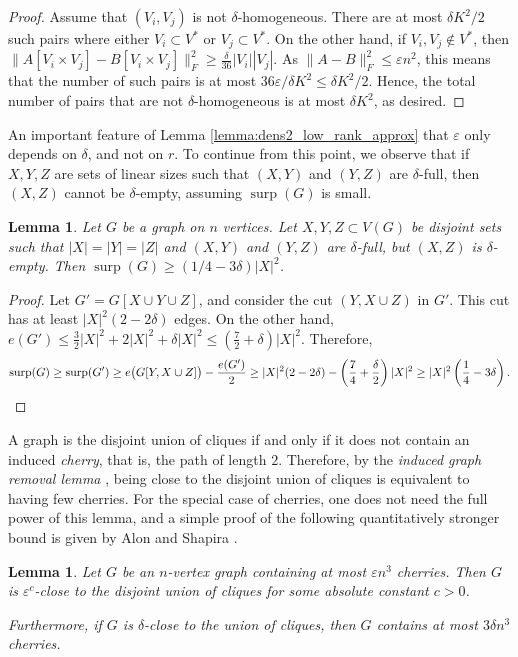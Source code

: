 \documentclass[11pt]{article}
\theoremstyle{plain}
\newtheorem{lemma}[theorem]{Lemma}
\theoremstyle{definition}
\DeclareMathOperator{\surp}{surp}
\newcommand{\eps}{\varepsilon}
\begin{document}
\begin{proof}
Assume that $(V_i,V_j)$ is not $\delta$-homogeneous. There are at most $\delta K^2/2$ such pairs where either $V_i\subset V^*$ or $V_j\subset V^*$. On the other hand, if $V_i,V_j\not\in V^*$, then $\|A[V_i\times V_j]-B[V_i\times V_j]\|_F^2\geq \frac{\delta}{36}|V_i||V_j|$. As $\|A-B\|_F^2\leq \eps n^2$, this means that the number of such pairs is at most $36\eps/\delta K^2\leq \delta K^2/2$. Hence, the total number of pairs that are not $\delta$-homogeneous is at most $\delta K^2$, as desired.
\end{proof}

An important feature of Lemma \ref{lemma:dens2_low_rank_approx} that $\eps$ only depends on $\delta$, and not on $r$. 
To continue from this point, we observe that if $X,Y,Z$ are sets of linear sizes such that $(X,Y)$ and $(Y,Z)$ are $\delta$-full, then $(X,Z)$ cannot be $\delta$-empty, assuming $\surp(G)$ is small.

\begin{lemma}\label{lemma:dens2_3parts}
    Let $G$ be a graph on $n$ vertices.
    Let $X,Y,Z\subset V(G)$ be disjoint sets such that $|X|=|Y|=|Z|$ and $(X,Y)$ and $(Y,Z)$ are $\delta$-full, but $(X,Z)$ is $\delta$-empty. Then $\surp(G)\geq (1/4-3\delta)|X|^2$.
\end{lemma}
\begin{proof}
    Let $G'=G[X\cup Y\cup Z]$, and consider the cut $(Y,X\cup Z)$ in $G'$. This cut has at least $|X|^2(2-2\delta)$ edges. 
    On the other hand, $e(G')\leq \frac{3}{2}|X|^2+2|X|^2+\delta|X|^2\leq (\frac{7}{2}+\delta)|X|^2$. Therefore, 
    \[\surp(G)\geq \surp(G')\ge e\big(G[Y,X\cup Z] \big)-\frac{e(G')}{2}\geq  |X|^2(2-2\delta)-\left(\frac{7}{4}+\frac{\delta}{2}\right)|X|^2\ge|X|^2\left(\frac{1}{4}-3\delta\right).\hfill \qedhere\]
\end{proof}

A graph is the disjoint union of cliques if and only if it does not contain an induced \emph{cherry}, that is, the path of length $2$. Therefore, by the \emph{induced graph removal lemma} \cite{AFKSz}, being close to the disjoint union of cliques is equivalent to having few cherries. For the special case of cherries, one does not need the full power of this lemma, and a simple proof of the following quantitatively stronger bound is given by Alon and Shapira \cite{AS06}.

\begin{lemma}\label{lemma:dens2_removal}
Let $G$ be an $n$-vertex graph containing at most $\eps n^3$ cherries. Then $G$ is $\eps^{c}$-close to the disjoint union of cliques for some absolute constant $c>0$.

Furthermore, if $G$ is $\delta$-close to the union of cliques, then $G$ contains at most $3\delta n^3$ cherries.
\end{lemma}
\end{document}
